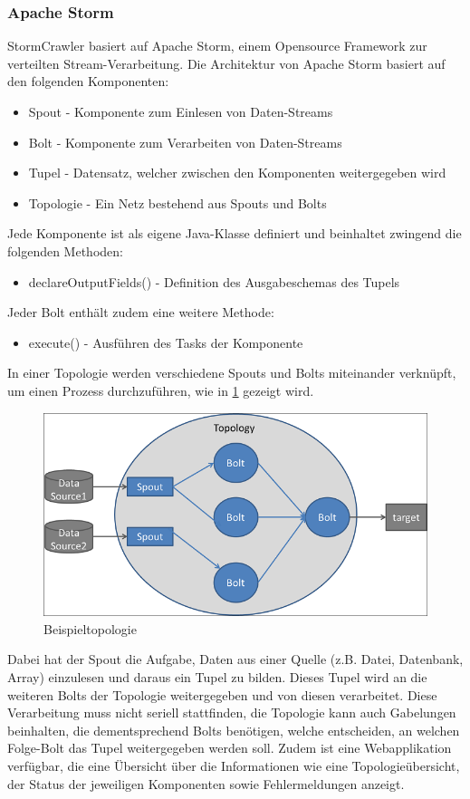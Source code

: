 \subsubsection{Apache Storm}
StormCrawler basiert auf Apache Storm, einem Opensource Framework zur verteilten Stream-Verarbeitung.
Die Architektur von Apache Storm basiert auf den folgenden Komponenten:
\begin{itemize}
	\item Spout - Komponente zum Einlesen von Daten-Streams
	\item Bolt - Komponente zum Verarbeiten von Daten-Streams
	\item Tupel - Datensatz, welcher zwischen den Komponenten weitergegeben wird
	\item Topologie - Ein Netz bestehend aus Spouts und Bolts
\end{itemize}
Jede Komponente ist als eigene Java-Klasse definiert und beinhaltet zwingend die folgenden Methoden:
\begin{itemize}
	\item declareOutputFields() - Definition des Ausgabeschemas des Tupels
\end{itemize}
Jeder Bolt enthält zudem eine weitere Methode:
\begin{itemize}
	\item execute() - Ausführen des Tasks der Komponente
\end{itemize}
In einer Topologie werden verschiedene Spouts und Bolts miteinander verknüpft, um einen Prozess durchzuführen, wie in \cref{fig:topology} gezeigt wird.
\begin{figure}[H]	
	\includegraphics[width=0.8\columnwidth,keepaspectratio]{img/storm-topology.png}
	\caption{Beispieltopologie}
	\label{fig:topology}
\end{figure}
Dabei hat der Spout die Aufgabe, Daten aus einer Quelle (z.B. Datei, Datenbank, Array) einzulesen und daraus ein Tupel zu bilden.
Dieses Tupel wird an die weiteren Bolts der Topologie weitergegeben und von diesen verarbeitet.
Diese Verarbeitung muss nicht seriell stattfinden, die Topologie kann auch Gabelungen beinhalten, die dementsprechend Bolts benötigen, welche entscheiden, an welchen Folge-Bolt das Tupel weitergegeben werden soll.
Zudem ist eine Webapplikation verfügbar, die eine Übersicht über die Informationen wie eine Topologieübersicht, der Status der jeweiligen Komponenten sowie Fehlermeldungen anzeigt.
